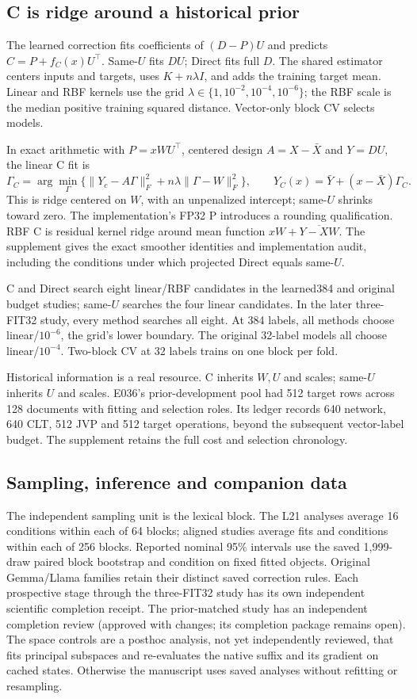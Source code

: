 \documentclass[11pt]{article}
\begin{document}
\subsection{C is ridge around a historical prior}
The learned correction fits coefficients of $(D-P)U$ and predicts $C=P+f_C(x)U^\top$. Same-$U$ fits $DU$; Direct fits full $D$. The shared estimator centers inputs and targets, uses $K+n\lambda I$, and adds the training target mean. Linear and RBF kernels use the grid $\lambda\in\{1,10^{-2},10^{-4},10^{-6}\}$; the RBF scale is the median positive training squared distance. Vector-only block CV selects models.

In exact arithmetic with $P=xWU^\top$, centered design $A=X-\bar X$ and $Y=DU$, the linear C fit is
\[
 \Gamma_C=\arg\min_\Gamma\big\{\|Y_c-A\Gamma\|_F^2+n\lambda\|\Gamma-W\|_F^2\big\},
 \qquad \widehat Y_C(x)=\bar Y+(x-\bar X)\Gamma_C.
\]
This is ridge centered on $W$, with an unpenalized intercept; same-$U$ shrinks toward zero. The implementation's FP32 P introduces a rounding qualification. RBF C is residual kernel ridge around mean function $xW+\overline{Y-XW}$. The supplement gives the exact smoother identities and implementation audit, including the conditions under which projected Direct equals same-$U$.

C and Direct search eight linear/RBF candidates in the learned384 and original budget studies; same-$U$ searches the four linear candidates. In the later three-FIT32 study, every method searches all eight. At 384 labels, all methods choose linear/$10^{-6}$, the grid's lower boundary. The original 32-label models all choose linear/$10^{-4}$. Two-block CV at 32 labels trains on one block per fold.

Historical information is a real resource. C inherits $W,U$ and scales; same-$U$ inherits $U$ and scales. E036's prior-development pool had 512 target rows across 128 documents with fitting and selection roles. Its ledger records 640 network, 640 CLT, 512 JVP and 512 target operations, beyond the subsequent vector-label budget. The supplement retains the full cost and selection chronology.

\subsection{Sampling, inference and companion data}
The independent sampling unit is the lexical block. The L21 analyses average 16 conditions within each of 64 blocks; aligned studies average fits and conditions within each of 256 blocks. Reported nominal 95\% intervals use the saved 1,999-draw paired block bootstrap and condition on fixed fitted objects. Original Gemma/Llama families retain their distinct saved correction rules. Each prospective stage through the three-FIT32 study has its own independent scientific completion receipt. The prior-matched study has an independent completion review (approved with changes; its completion package remains open). The space controls are a posthoc analysis, not yet independently reviewed, that fits principal subspaces and re-evaluates the native suffix and its gradient on cached states. Otherwise the manuscript uses saved analyses without refitting or resampling.
\end{document}
